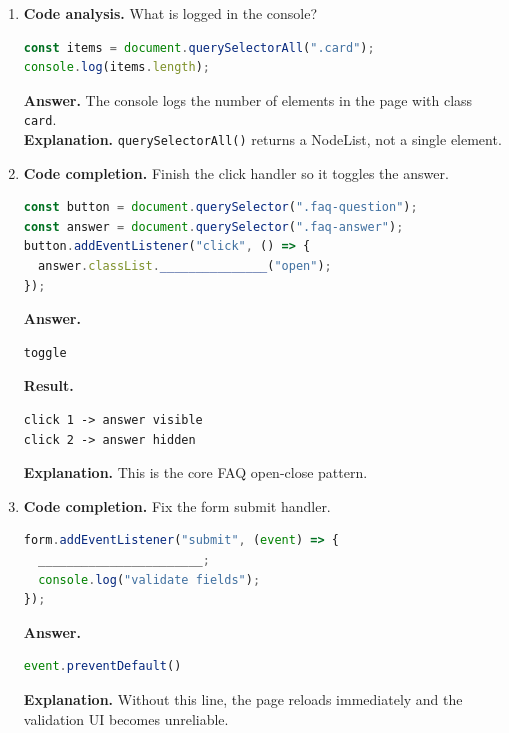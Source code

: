 \documentclass[11pt,a4paper]{article}
\begin{document}
\begin{enumerate}
\begin{lstlisting}[style=code]
@media (max-width: 768px) {
  nav ul {
    _______________________;
  }
}
\end{lstlisting}
\textbf{Answer.}
\begin{lstlisting}[style=code]
flex-direction: column;
\end{lstlisting}
\textbf{Result.}
\begin{lstlisting}[style=terminal]
Desktop: Home | About | Contact
Mobile:
Home
About
Contact
\end{lstlisting}
\textbf{Explanation.} This is one of the most common practical CSS patterns for responsive navigation.

  \item \textbf{Code analysis.} What is logged in the console?
\begin{lstlisting}[style=code, language=JavaScript]
const items = document.querySelectorAll(".card");
console.log(items.length);
\end{lstlisting}
\textbf{Answer.} The console logs the number of elements in the page with class \texttt{card}.\\
\textbf{Explanation.} \texttt{querySelectorAll()} returns a NodeList, not a single element.

  \item \textbf{Code completion.} Finish the click handler so it toggles the answer.
\begin{lstlisting}[style=code, language=JavaScript]
const button = document.querySelector(".faq-question");
const answer = document.querySelector(".faq-answer");
button.addEventListener("click", () => {
  answer.classList._______________("open");
});
\end{lstlisting}
\textbf{Answer.}
\begin{lstlisting}[style=code, language=JavaScript]
toggle
\end{lstlisting}
\textbf{Result.}
\begin{lstlisting}[style=terminal]
click 1 -> answer visible
click 2 -> answer hidden
\end{lstlisting}
\textbf{Explanation.} This is the core FAQ open-close pattern.

  \item \textbf{Code completion.} Fix the form submit handler.
\begin{lstlisting}[style=code, language=JavaScript]
form.addEventListener("submit", (event) => {
  _______________________;
  console.log("validate fields");
});
\end{lstlisting}
\textbf{Answer.}
\begin{lstlisting}[style=code, language=JavaScript]
event.preventDefault()
\end{lstlisting}
\textbf{Explanation.} Without this line, the page reloads immediately and the validation UI becomes unreliable.


\end{enumerate}
\end{document}
